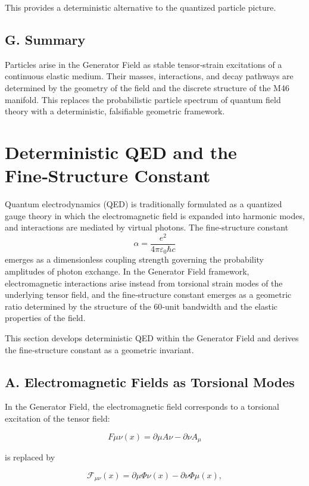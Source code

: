 \documentclass[reprint,amsmath,amssymb,aps,prl,floatfix]{revtex4-2}
\begin{document}
This provides a deterministic alternative to the quantized particle picture.

\subsection{G. Summary}

Particles arise in the Generator Field as stable tensor‑strain excitations of a continuous elastic medium. Their masses, interactions, and decay pathways are determined by the geometry of the field and the discrete structure of the M46 manifold. This replaces the probabilistic particle spectrum of quantum field theory with a deterministic, falsifiable geometric framework.

\section{Deterministic QED and the Fine‑Structure Constant}

Quantum electrodynamics (QED) is traditionally formulated as a quantized gauge theory in which the electromagnetic field is expanded into harmonic modes, and interactions are mediated by virtual photons. The fine‑structure constant  
\[
\alpha = \frac{e^2}{4\pi\varepsilon_0\hbar c}
\]
emerges as a dimensionless coupling strength governing the probability amplitudes of photon exchange. In the Generator Field framework, electromagnetic interactions arise instead from torsional strain modes of the underlying tensor field, and the fine‑structure constant emerges as a geometric ratio determined by the structure of the 60‑unit bandwidth and the elastic properties of the field.
\medskip

This section develops deterministic QED within the Generator Field and derives the fine‑structure constant as a geometric invariant.

\subsection{A. Electromagnetic Fields as Torsional Modes}

In the Generator Field, the electromagnetic field corresponds to a torsional excitation of the tensor field:
\medskip

\[
F{\mu\nu}(x) = \partial\mu A\nu - \partial\nu A_\mu
\]
\medskip

is replaced by

\[
\mathcal{F}_{\mu\nu}(x)
=
\partial\mu \Phi{\nu}(x)
-
\partial\nu \Phi{\mu}(x),
\]
\end{document}

